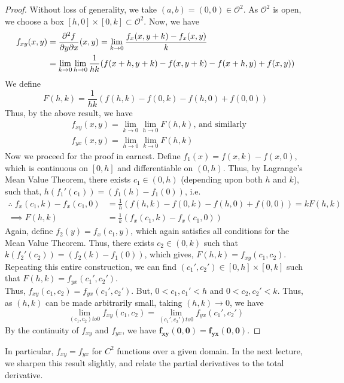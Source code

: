 \documentclass[../Analysis-3]{subfiles}
\begin{document}
\begin{proof}
    Without loss of generality, we take $(a,b) = (0,0) \in \mathcal{O}^2$. As $\mathcal{O}^2$ is open, we choose a box $[h,0]\times [0,k] \subset \mathcal{O}^2$. Now, we have
\begin{align*}
    f_{xy}(x,y) &= \pdv{f}{y}{x}\/(x,y) = \lim_{k \to 0} \frac{f_x(x,y+k) - f_x(x,y)}{k} \\
                        &= \lim_{k \to 0} \lim_{h \to 0} \frac{1}{hk}(f(x+h,y+k) - f(x,y+k) - f(x+h,y)+ f(x,y)) 
\end{align*}
We define 
\[F(h,k) = \frac{1}{hk}(f(h,k) - f(0,k) - f(h,0)+ f(0,0))\]
Thus, by the above result, we have
\begin{align*}
    &f_{xy}(x,y) = \lim_{k \to 0} \lim_{h \to 0} F(h,k) \text{, and similarly}\\ &f_{yx}(x,y) = \lim_{h \to 0} \lim_{k \to 0} F(h,k)
\end{align*}
Now we proceed for the proof in earnest. Define $f_1(x) = f(x,k) - f(x,0)$, which is continuous on $[0,h]$ and differentiable on $(0,h)$. Thus, by Lagrange's Mean Value Theorem, there exists $c_1 \in (0,h)$ (depending upon both $h$ and $k$), such that, $h(f_1'(c_1)) = (f_1(h) - f_1(0))$, i.e.
\begin{align*}
    \therefore\; f_x(c_1,k) - f_x(c_1,0) &=  \frac{1}{h}(f(h,k) - f(0,k) - f(h,0)+ f(0,0)) = kF(h,k)\\
    \implies F(h,k) &= \frac{1}{k}(f_x(c_1,k) - f_x(c_1,0))
\end{align*}
Again, define $f_2(y) = f_x(c_1,y)$, which again satisfies all conditions for the Mean Value Theorem. Thus, there exists $c_2 \in (0,k)$ such that $k(f_2'(c_2)) = (f_2(k) - f_1(0))$, which gives, $F(h,k) = f_{xy}(c_1, c_2)$.\\
Repeating this entire construction, we can find $(c_1', c_2') \in [0,h]\times[0,k]$ such that $F(h,k) = f_{yx}(c_1', c_2')$.\\
Thus, $f_{xy}(c_1, c_2) = f_{yx}(c_1', c_2')$. But, $0 < c_1, c_1' < h$ and $0 < c_2, c_2' < k$. Thus, as $(h,k)$ can be made arbitrarily small, taking  $(h,k) \to 0$, we have
\[
    \lim_{(c_1, c_2) to 0} f_{xy}(c_1, c_2) = \lim_{(c_1', c_2') to 0} f_{yx}(c_1', c_2')
\]
By the continuity of $f_{xy}$ and $f_{yx}$, we have $\mathbf{f_{xy}(0,0) = f_{yx}(0,0)}$.

\end{proof}
\vspace{.2 cm}

In particular, $f_{xy} = f_{yx}$ for $C^2$ functions over a given domain. In the next lecture, we sharpen this result slightly, and relate the  partial derivatives to the total derivative.
\end{document}

